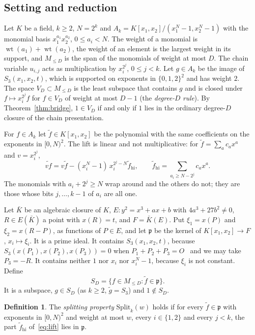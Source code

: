 \documentclass[11pt]{article}
\theoremstyle{definition}\newtheorem{definition}[theorem]{Definition}
\theoremstyle{remark}\newtheorem{remark}[theorem]{Remark}
\newcommand{\wt}{\operatorname{wt}}
\begin{document}
\subsection{Setting and reduction}\label{app:growthsetting}
Let $K$ be a field, $k\ge2$, $N=2^k$ and
$A_k=K[x_1,x_2]/(x_1^N-1,x_2^N-1)$ with the monomial basis
$x_1^{a_1}x_2^{a_2}$, $0\le a_i<N$. The weight of a monomial is
$\wt(a_1)+\wt(a_2)$, the weight of an element is the largest weight in its
support, and $M_{\le D}$ is the span of the monomials of weight at most
$D$. The chain variable $u_{i,j}$ acts as multiplication by $x_i^{2^j}$,
$0\le j<k$. Let $g\in A_k$ be the image of $S_3(x_1,x_2,t)$, which is
supported on exponents in $\{0,1,2\}^2$ and has weight $2$. The space
$V_D\subset M_{\le D}$ is the least subspace that contains $g$ and is
closed under $f\mapsto x_i^{2^j}f$ for $f\in V_D$ of weight at most $D-1$
(the \emph{degree-$D$ rule}). By Theorem~\ref{thm:bridge}, $1\in V_D$ if
and only if $1$ lies in the ordinary degree-$D$ closure of the chain
presentation.

For $f\in A_k$ let $\tilde f\in K[x_1,x_2]$ be the polynomial with the same
coefficients on the exponents in $[0,N)^2$. The lift is linear and not
multiplicative: for $\tilde f=\sum_a c_ax^a$ and $v=x_i^{2^j}$,
\begin{equation}\label{eq:lift}
 \widetilde{vf}=v\tilde f-(x_i^N-1)\,x_i^{2^j-N}\tilde f_{\mathrm{hi}},
 \qquad \tilde f_{\mathrm{hi}}=\sum_{a_i\ge N-2^j}c_ax^a .
\end{equation}
The monomials with $a_i+2^j\ge N$ wrap around and the others do not; they
are those whose bits $j,\ldots,k-1$ of $a_i$ are all one.

Let $\bar K$ be an algebraic closure of $K$, $E\colon y^2=x^3+ax+b$ with
$4a^3+27b^2\ne0$, $R\in E(\bar K)$ a point with $x(R)=t$, and
$F=\bar K(E)$. Put $\xi_1=x(P)$ and $\xi_2=x(R-P)$, as functions of
$P\in E$, and let $\mathfrak p$ be the kernel of $K[x_1,x_2]\to F$,
$x_i\mapsto\xi_i$. It is a prime ideal. It contains $S_3(x_1,x_2,t)$,
because $S_3(x(P_1),x(P_2),x(P_3))=0$ when $P_1+P_2+P_3=O$~\cite{semaev}
and we may take $P_3=-R$. It contains neither $1$ nor $x_i$ nor $x_i^N-1$,
because $\xi_i$ is not constant. Define
\[
 S_D=\{f\in M_{\le D}:\tilde f\in\mathfrak p\}.
\]
It is a subspace, $g\in S_D$ (as $k\ge2$, $\tilde g=S_3$) and $1\notin S_D$.

\begin{definition}\label{def:fei}
The \emph{splitting property} $\mathrm{Split}_k(w)$ holds if for every
$\tilde f\in\mathfrak p$ with exponents in $[0,N)^2$ and weight at most
$w$, every $i\in\{1,2\}$ and every $j<k$, the part
$\tilde f_{\mathrm{hi}}$ of~\eqref{eq:lift} lies in $\mathfrak p$.
\end{definition}
\end{document}

